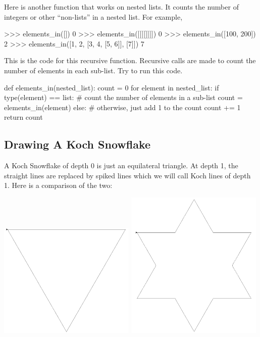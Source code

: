 \documentclass[11pt]{cselabheader}
\begin{document}
Here is another function that works on nested lists.
It counts the number of integers or other ``non-lists'' in a nested list.
For example,

\begin{pyconcode}
>>> elements_in([])
0
>>> elements_in([[[[]]]])
0
>>> elements_in([100, 200])
2
>>> elements_in([1, 2, [3, 4, [5, 6]], [7]])
7
\end{pyconcode}

This is the code for this recursive function. Recursive calls are made to count
the number of elements in each sub-list. Try to run this code.

\begin{python3code}
def elements_in(nested_list):
    count = 0
    for element in nested_list:
        if type(element) == list:
            # count the number of elements in a sub-list
            count = elements_in(element)
        else:
            # otherwise, just add 1 to the count
            count += 1
    return count
\end{python3code}

\subsection{Drawing A Koch Snowflake}

A Koch Snowflake of depth 0 is just an equilateral triangle.  At depth
1, the straight lines are replaced by spiked lines which we will call
Koch lines of depth 1.  Here is a comparison of the two:

\begin{center}
\includegraphics[width=0.49\textwidth]{img/koch0.png}
\includegraphics[width=0.49\textwidth]{img/koch1.png}
\end{center}
\end{document}
